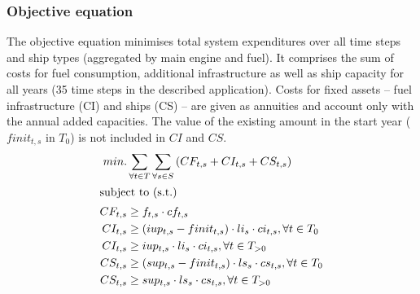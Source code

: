 \documentclass[article]{elsarticle}
\begin{document}
\subsubsection{Objective equation}
The objective equation minimises total system expenditures over all time steps and ship types (aggregated by main engine and fuel). It comprises the sum of  costs for fuel consumption, additional infrastructure as well as ship capacity for all years (35 time steps in the described application). Costs for fixed assets -- fuel infrastructure (CI) and ships (CS) -- are given as annuities and account only with the annual added capacities. The value of the existing amount in the start year ($finit_{t,s}$ in $T_0$) is not included in $CI$ and $CS$.
\begin{subequations}
    \begin{align}
        min. &\sum_{\forall t \in T}\sum_{\forall s \in S}\left( CF_{t, s} + CI_{t, s} + CS_{t, s} \right)\\
        \intertext{subject to (s.t.)}
        CF_{t, s} &\geq f_{t,s} \cdot cf_{t,s}\\
        CI_{t, s} &\geq \left( iup_{t,s} - finit_{t, s} \right) \cdot li_{s} \cdot ci_{t,s}, \forall t \in T_0\\
        CI_{t, s} &\geq iup_{t,s} \cdot li_{s} \cdot ci_{t,s}, \forall t \in T_{>0}\\
        CS_{t, s} &\geq \left( sup_{t,s} - finit_{t, s} \right) \cdot ls_{s} \cdot cs_{t,s}, \forall t \in T_0\\
        CS_{t, s} &\geq sup_{t,s} \cdot ls_{s} \cdot cs_{t,s}, \forall t \in T_{>0}
    \end{align}
\end{subequations}
\end{document}
